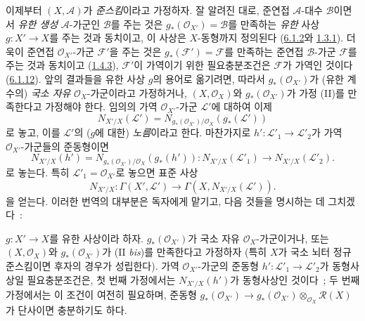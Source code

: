 \begin{env}[6.5.5]
\label{II.6.5.5-ko}
이제부터 $(X,\mathcal{A})$가 \emph{준스킴}이라고 가정하자. 잘 알려진
대로, 준연접 $\mathcal{A}$-대수 $\mathcal{B}$이면서 \emph{유한 생성}
$\mathcal{A}$-가군인 $\mathcal{B}$를 주는 것은
$g_*(\mathcal{O}_{X'})=\mathcal{B}$를 만족하는 \emph{유한} 사상
$g:X'\to X$를 주는 것과 동치이고, 이 사상은 $X$-동형까지 정의된다
(\hyperref[II.6.1.2-ko]{6.1.2}와
\hyperref[II.1.3.1-ko]{1.3.1}). 더욱이 준연접
$\mathcal{O}_{X'}$-가군 $\mathcal{F}'$을 주는 것은
$g_*(\mathcal{F}')=\mathcal{F}$를 만족하는 준연접 $\mathcal{B}$-가군
$\mathcal{F}$를 주는 것과 동치이고
(\hyperref[II.1.4.3-ko]{1.4.3}), $\mathcal{F}'$이 가역이기 위한
필요충분조건은 $\mathcal{F}$가 가역인 것이다
(\hyperref[II.6.1.12-ko]{6.1.12}). 앞의 결과들을 유한 사상 $g$의
용어로 옮기려면, 따라서 $g_*(\mathcal{O}_{X'})$가 (유한 계수의) \emph{국소
자유} $\mathcal{O}_X$-가군이라고 가정하거나,
$(X,\mathcal{O}_X)$와 $g_*(\mathcal{O}_{X'})$가 가정 (II)를 만족한다고
가정해야 한다. 임의의 가역 $\mathcal{O}_{X'}$-가군 $\mathcal{L}'$에
대하여 이제
\[
\label{II.6.5.5.1-ko}
N_{X'/X}(\mathcal{L}')
=N_{g_*(\mathcal{O}_{X'})/\mathcal{O}_X}(g_*(\mathcal{L}'))
\tag{6.5.5.1}
\]
로 놓고, 이를 $\mathcal{L}'$의 ($g$에 대한) \emph{노름}이라고 한다.
마찬가지로 $h':\mathcal{L}'_1\to\mathcal{L}'_2$가 가역
$\mathcal{O}_{X'}$-가군들의 준동형이면
\[
\label{II.6.5.5.2-ko}
N_{X'/X}(h')
=N_{g_*(\mathcal{O}_{X'})/\mathcal{O}_X}(g_*(h')):
N_{X'/X}(\mathcal{L}'_1)\to N_{X'/X}(\mathcal{L}'_2).
\tag{6.5.5.2}
\]
로 놓는다. 특히 $\mathcal{L}'_1=\mathcal{O}_{X'}$로 놓으면 표준 사상
\[
\label{II.6.5.5.3-ko}
N_{X'/X}:\Gamma(X',\mathcal{L}')
\to\Gamma(X,N_{X'/X}(\mathcal{L}')).
\tag{6.5.5.3}
\]
을 얻는다. 이러한 번역의 대부분은 독자에게 맡기고, 다음 것들을
명시하는 데 그치겠다~:
\end{env}

\begin{proposition}[6.5.6]
\label{II.6.5.6-ko}
$g:X'\to X$를 유한 사상이라 하자. $g_*(\mathcal{O}_{X'})$가
국소 자유 $\mathcal{O}_X$-가군이거나, 또는 $(X,\mathcal{O}_X)$와
$g_*(\mathcal{O}_{X'})$가 (II \emph{bis})를 만족한다고 가정하자
(특히 $X$가 국소 뇌터 정규 준스킴이면 후자의 경우가 성립한다).
가역 $\mathcal{O}_{X'}$-가군의 준동형
$h':\mathcal{L}'_1\to\mathcal{L}'_2$가 동형사상일 필요충분조건은,
첫 번째 가정에서는 $N_{X'/X}(h')$가 동형사상인 것이다~; 두 번째
가정에서는 이 조건이 여전히 필요하며, 준동형
$g_*(\mathcal{O}_{X'})\to
g_*(\mathcal{O}_{X'})\otimes_{\mathcal{O}_X}\mathcal{R}(X)$가
단사이면 충분하기도 하다.
\end{proposition}

